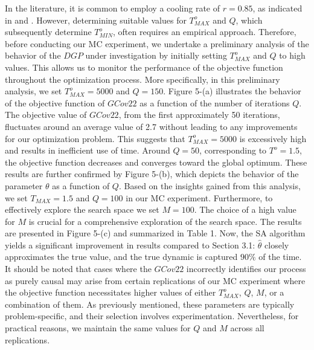 \documentclass[<1p>]{elsarticle} %
\begin{document}
\indent In the literature, it is common to employ a cooling rate of $r=0.85$, as indicated in \cite{goffe1994global} and \cite{corana1987minimizing}. However, determining suitable values for $T^{o}_{MAX}$ and $Q$, which subsequently determine $T^{o}_{MIN}$, often requires an empirical approach. Therefore, before conducting our MC experiment, we undertake a preliminary analysis of the behavior of the $DGP$ under investigation by initially setting $T^{o}_{MAX}$ and $Q$ to high values. This allows us to monitor the performance of the objective function throughout the optimization process. More specifically, in this preliminary analysis, we set $T^{o}_{MAX}=5000$ and $Q=150$. Figure 5-(a) illustrates the behavior of the objective function of $GCov22$ as a function of the number of iterations $Q$. The objective value of $GCov22$, from the first approximately 50 iterations, fluctuates around an average value of 2.7 without leading to any improvements for our optimization problem. This suggests that $T^{o}_{MAX}=5000$ is excessively high and results in inefficient use of time. Around $Q=50$, corresponding to $T^{o}=1.5$, the objective function decreases and converges toward the global optimum. These results are further confirmed by Figure 5-(b), which depicts the behavior of the parameter $\theta$ as a function of $Q$. Based on the insights gained from this analysis, we set $T_{MAX}=1.5$ and $Q=100$ in our MC experiment. Furthermore, to effectively explore the search space we set $M=100$. The choice of a high value for $M$ is crucial for a comprehensive exploration of the search space. The results are presented in Figure 5-(c) and summarized in Table 1. Now, the SA algorithm yields a significant improvement in results compared to Section 3.1: $\hat{\theta}$ closely approximates the true value, and the true dynamic is captured $90\%$ of the time. It should be noted that cases where the $GCov22$ incorrectly identifies our process as purely causal may arise from certain replications of our MC experiment where the objective function necessitates higher values of either $T^{o}_{MAX}$, $Q$, $M$, or a combination of them. As previously mentioned, these parameters are typically problem-specific, and their selection involves experimentation. Nevertheless, for practical reasons, we maintain the same values for $Q$ and $M$ across all replications.
\end{document}
